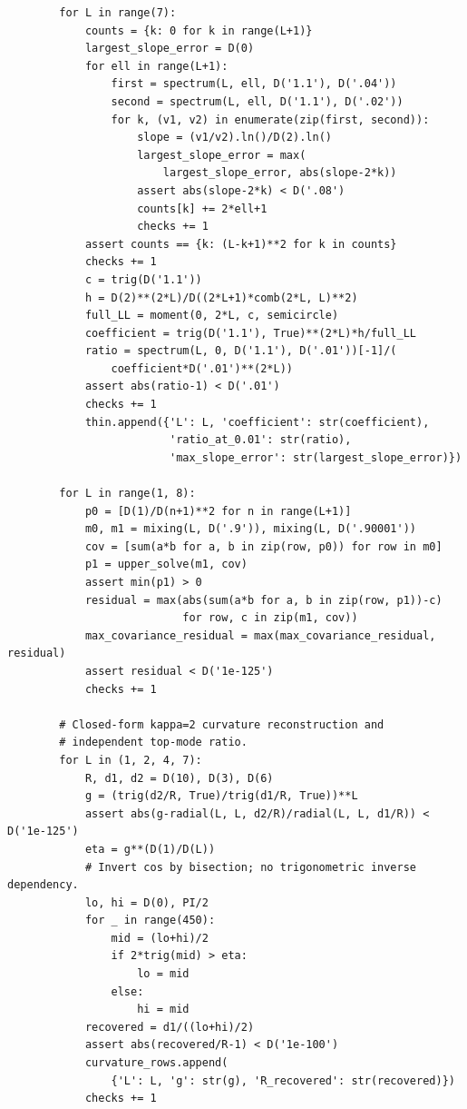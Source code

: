 \documentclass[aps,prd,reprint,amsmath,amssymb,nofootinbib,
longbibliography]{revtex4-2}
\begin{document}
\begin{lstlisting}
        for L in range(7):
            counts = {k: 0 for k in range(L+1)}
            largest_slope_error = D(0)
            for ell in range(L+1):
                first = spectrum(L, ell, D('1.1'), D('.04'))
                second = spectrum(L, ell, D('1.1'), D('.02'))
                for k, (v1, v2) in enumerate(zip(first, second)):
                    slope = (v1/v2).ln()/D(2).ln()
                    largest_slope_error = max(
                        largest_slope_error, abs(slope-2*k))
                    assert abs(slope-2*k) < D('.08')
                    counts[k] += 2*ell+1
                    checks += 1
            assert counts == {k: (L-k+1)**2 for k in counts}
            checks += 1
            c = trig(D('1.1'))
            h = D(2)**(2*L)/D((2*L+1)*comb(2*L, L)**2)
            full_LL = moment(0, 2*L, c, semicircle)
            coefficient = trig(D('1.1'), True)**(2*L)*h/full_LL
            ratio = spectrum(L, 0, D('1.1'), D('.01'))[-1]/(
                coefficient*D('.01')**(2*L))
            assert abs(ratio-1) < D('.01')
            checks += 1
            thin.append({'L': L, 'coefficient': str(coefficient),
                         'ratio_at_0.01': str(ratio),
                         'max_slope_error': str(largest_slope_error)})

        for L in range(1, 8):
            p0 = [D(1)/D(n+1)**2 for n in range(L+1)]
            m0, m1 = mixing(L, D('.9')), mixing(L, D('.90001'))
            cov = [sum(a*b for a, b in zip(row, p0)) for row in m0]
            p1 = upper_solve(m1, cov)
            assert min(p1) > 0
            residual = max(abs(sum(a*b for a, b in zip(row, p1))-c)
                           for row, c in zip(m1, cov))
            max_covariance_residual = max(max_covariance_residual, residual)
            assert residual < D('1e-125')
            checks += 1

        # Closed-form kappa=2 curvature reconstruction and
        # independent top-mode ratio.
        for L in (1, 2, 4, 7):
            R, d1, d2 = D(10), D(3), D(6)
            g = (trig(d2/R, True)/trig(d1/R, True))**L
            assert abs(g-radial(L, L, d2/R)/radial(L, L, d1/R)) < D('1e-125')
            eta = g**(D(1)/D(L))
            # Invert cos by bisection; no trigonometric inverse dependency.
            lo, hi = D(0), PI/2
            for _ in range(450):
                mid = (lo+hi)/2
                if 2*trig(mid) > eta:
                    lo = mid
                else:
                    hi = mid
            recovered = d1/((lo+hi)/2)
            assert abs(recovered/R-1) < D('1e-100')
            curvature_rows.append(
                {'L': L, 'g': str(g), 'R_recovered': str(recovered)})
            checks += 1


\end{lstlisting}
\end{document}
